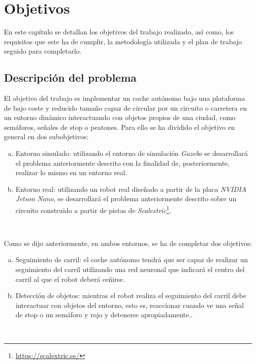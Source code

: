 \chapter{Objetivos}
\label{cap:capitulo2}

En este capítulo se detallan los objetivos del trabajo realizado, así como, los requisitos que este ha de cumplir, la metodología utilizada y el plan de trabajo seguido para completarlo.\\

\section{Descripción del problema}
\label{sec:descripcion}

El objetivo del trabajo es implementar un coche autónomo bajo una plataforma de bajo coste y reducido tamaño capaz de circular por un circuito o carretera en un entorno dinámico interactuando con objetos propios de una ciudad, como semáforos, señales de stop o peatones. Para ello se ha dividido el objetivo en general en dos subobjetivos:

\begin{enumerate}[(a)]
	\item Entorno simulado: utilizando el entorno de simulación \textit{Gazebo} se desarrollará el problema anteriormente descrito con la finalidad de, posteriormente, realizar lo mismo en un entorno real.\\
	\item Entorno real: utilizando un robot real diseñado a partir de la placa \textit{NVIDIA Jetson Nano}, se desarrollará el problema anteriormente descrito sobre un circuito construido a partir de pistas de \textit{Scalextric}\footnote{\url{https://scalextric.es/}}.\\
\end{enumerate}\

Como se dijo anteriormente, en ambos entornos, se ha de completar dos objetivos:

\begin{enumerate}[(a)]
	\item Seguimiento de carril: el coche autónomo tendrá que ser capaz de realizar un seguimiento del carril utilizando una red neuronal que indicará el centro del carril al que el robot deberá ceñirse.
	\item Detección de objetos: mientras el robot realiza el seguimiento del carril debe interactuar con objetos del entorno, esto es, reaccionar cuando ve una señal de stop o un semáforo y rojo y detenerse apropiadamente..
\end{enumerate}\

